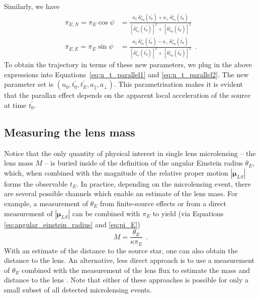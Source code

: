 \documentclass[12pt,dvipsnames]{report}
\newcommand{\hquad}{~~}
\begin{document}
Similarly, we have
\begin{align}
    \pi_{E,N}=\pi_E\cos\psi & = \frac{a_\parallel\,\delta\ddot{\zeta}_n(t_0^\prime) + a_\bot\,\delta\ddot{\zeta}_e(t_0^\prime)
    }{[\delta\ddot{\zeta}_e(t_0^\prime)]^2 + [\delta\ddot{\zeta}_n(t_0^\prime)]^2}                                              \\
    \pi_{E,E}=\pi_E\sin\psi & = \frac{ a_\parallel\,\delta\ddot{\zeta}_e(t_0^\prime) - a_\bot\,\delta\ddot{\zeta}_n(t_0^\prime)
    }{[\delta\ddot{\zeta}_e(t_0^\prime)]^2 + [\delta\ddot{\zeta}_n(t_0^\prime)]^2}
    \hquad.
\end{align}
To obtain the trajectory in terms of these new parameters, we plug in the above expressions
into Equations~\ref{eq:u_t_parallel1} and \ref{eq:u_t_parallel2}.
The new parameter set is $\left(u_0,t_0^\prime,t_E^\prime,a_\parallel,a_\bot\right)$. This parametrisation makes 
it is evident that the parallax
effect depends on the apparent local acceleration of the source at time $t_0^\prime$.

\subsection{Measuring the lens mass}
Notice that the only quantity of physical interest in single lens microlensing --
the lens mass $M$ -- is buried inside of the definition of the angular Einstein
radius $\theta_E$, which, when combined with the magnitude of the relative
proper motion $|\boldsymbol\mu_{LS}|$ forms the observable $t_E$. In practice,
depending on the microlensing event, there are several possible channels which
enable an estimate of the lens mass. For example, a measurement of $\theta_E$
from finite-source effects or from a direct measurement of
$|\boldsymbol\mu_{LS}|$ can be combined with $\pi_E$ to yield
(via Equations \ref{eq:angular_einstein_radius} and \ref{eq:pi_E})
\begin{equation}
    M = \frac{\theta_E}{\kappa \pi_E}
    \hquad.
\end{equation}
With an estimate of the distance to the source star, one can also obtain the distance
to the lens.
An alternative, less direct approach is to use a measurement of $\theta_E$ combined
with the measurement of the lens flux to estimate the mass and distance to the lens
\citep{2007ApJ...660..781B}.
Note that either of these approaches is possible for only a small subset
of all detected microlensing events.
\end{document}
